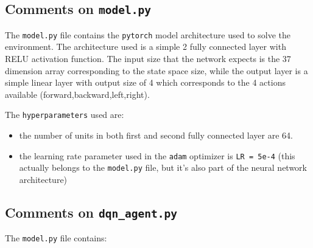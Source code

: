 \documentclass[
]{article}
\providecommand{\tightlist}{%
  \setlength{\itemsep}{0pt}\setlength{\parskip}{0pt}}
\begin{document}
\hypertarget{comments-on-model.py}{%
\subsection{\texorpdfstring{Comments on
\texttt{model.py}}{Comments on model.py}}\label{comments-on-model.py}}

The \texttt{model.py} file contains the \texttt{pytorch} model
architecture used to solve the environment. The architecture used is a
simple 2 fully connected layer with RELU activation function. The input
size that the network expects is the 37 dimension array corresponding to
the state space size, while the output layer is a simple linear layer
with output size of 4 which corresponds to the 4 actions available
(forward,backward,left,right).

The \texttt{hyperparameters} used are:

\begin{itemize}
\tightlist
\item
  the number of units in both first and second fully connected layer are
  64.
\item
  the learning rate parameter used in the \texttt{adam} optimizer is
  \texttt{LR\ =\ 5e-4} (this actually belongs to the \texttt{model.py}
  file, but it's also part of the neural network architecture)
\end{itemize}

\hypertarget{comments-on-dqn_agent.py}{%
\subsection{\texorpdfstring{Comments on
\texttt{dqn\_agent.py}}{Comments on dqn\_agent.py}}\label{comments-on-dqn_agent.py}}

The \texttt{model.py} file contains:
\end{document}
